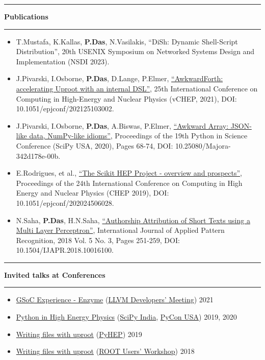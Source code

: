 \documentclass[10pt, letterpaper]{article}
\newcommand{\Section}[1]{
    \Line \par
    \vspace{1pt}
    \textbf{\fontsize{13}{13}\selectfont #1} \par
    \vspace{-7pt}
    \Line \par
    \vspace{3pt}
}
\newcommand{\Line}{
\noindent\rule{\textwidth}{0.4pt}}
\newenvironment{tightitemize}
{
    \vspace{-\topsep}
    \begin{itemize}
        \itemsep2pt \parskip0pt \parsep0pt
}
{
    \end{itemize}
    \vspace{-\topsep}
}
\begin{document}
%
%
\Section{Publications}
\small{\begin{tightitemize}
    \item T.Mustafa, K.Kallas, \textbf{P.Das}, N.Vasilakis, ``DiSh: Dynamic Shell-Script Distribution'', 20th USENIX Symposium on Networked Systems Design and Implementation (NSDI 2023).
    \item J.Pivarski, I.Osborne, {\textbf{P.Das}}, D.Lange, P.Elmer, {\href{https://www.epj-conferences.org/articles/epjconf/abs/2021/05/epjconf_chep2021_03002/epjconf_chep2021_03002.html}{``AwkwardForth: accelerating Uproot with an internal DSL''}}, 25th International Conference on Computing in High-Energy and Nuclear Physics (vCHEP, 2021), DOI: 10.1051/epjconf/202125103002.
    \item J.Pivarski, I.Osborne, {\textbf{P.Das}}, A.Biswas, P.Elmer, {\href{http://conference.scipy.org/proceedings/scipy2020/jim_pivarski.html}{``Awkward Array: JSON-like data, NumPy-like idioms''}}, Proceedings of the 19th Python in Science Conference (SciPy USA, 2020), Pages 68-74, DOI: 10.25080/Majora-342d178e-00b.
    \item E.Rodrigues, et al., {\href{https://www.epj-conferences.org/articles/epjconf/abs/2020/21/epjconf_chep2020_06028/epjconf_chep2020_06028.html}{``The Scikit HEP Project - overview and prospects''}}, Proceedings of the 24th International Conference on Computing in High Energy and Nuclear Physics (CHEP 2019), DOI: 10.1051/epjconf/202024506028.
    \item N.Saha, {\textbf{P.Das}}, H.N.Saha, {\href{https://www.inderscienceonline.com/doi/abs/10.1504/IJAPR.2018.094819}{``Authorship Attribution of Short Texts using a Multi Layer Perceptron''}}, International Journal of Applied Pattern Recognition, 2018 Vol. 5 No. 3, Pages 251-259, DOI: 10.1504/IJAPR.2018.10016100.
\end{tightitemize}}

%
%
\Section{Invited talks at Conferences}
\begin{tightitemize}
\item \href{https://youtu.be/mxI9fYbpndI}{GSoC Experience - Enzyme} (\href{https://llvm.swoogo.com/2021devmtg/}{LLVM Developers' Meeting}) \hfill{2021}
\item \href{https://youtu.be/jClVsR6XfdI}{Python in High Energy Physics} (\href{https://scipy.in/2019}{SciPy India}, \href{https://us.pycon.org/2020/}{PyCon USA}) \hfill{2019, 2020}
\item \href{https://indico.cern.ch/event/833895/contributions/3577892/attachments/1927752/3191883/uproot-pyhep.pdf}{Writing files with uproot} (\href{https://indico.cern.ch/event/833895/}{PyHEP}) \hfill{2019}
\item \href{https://indico.cern.ch/event/697389/contributions/3102807/attachments/1713054/2762448/Writing_files_with_uproot.pdf}{Writing files with uproot} (\href{https://indico.cern.ch/event/697389/}{ROOT Users' Workshop}) \hfill{2018}
\end{tightitemize}
\end{document}
